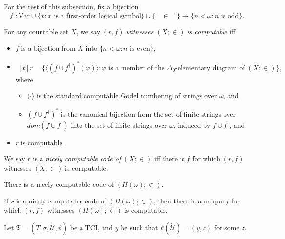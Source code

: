 \documentclass[12pt]{article}
\numberwithin{equation}{section}
\begin{document}
For the rest of this subsection, fix a bijection $$f^{\dagger} : \mathrm{Var} \cup \{x : x \text{ is a first-order logical symbol}\} \cup \{\ulcorner \in \urcorner\} \longrightarrow \{n < \omega : n \text{ is odd}\}.$$

\begin{defi}
For any countable set $X$, we say $(r, f)$ \emph{witnesses} $(X; \in)$ \emph{is computable} iff
\begin{itemize} 
    \item $f$ is a bijection from $X$ into $\{n < \omega : n \text{ is even}\}$,
    \item
    \!
    $\begin{aligned}[t]
        r = \{\langle (f \cup f^{\dagger})^*(\varphi) \rangle : \varphi \text{ is a member of the } \Delta_0 \text{-elementary diagram of } (X; \in)\}, 
    \end{aligned}$
    \medskip
    \\
    where 
    \begin{itemize}[label=$\circ$]
        \item $\langle \cdot \rangle$ is the standard computable G\"odel numbering of strings over $\omega$, and
        \item $(f \cup f^{\dagger})^*$ is the canonical bijection from the set of finite strings over $dom(f \cup f^{\dagger})$ into the set of finite strings over $\omega$, induced by $f \cup f^{\dagger}$, and
    \end{itemize}
    \item $r$ is computable.
\end{itemize}
We say $r$ is a \emph{nicely computable code of} $(X; \in)$ iff there is $f$ for which $(r, f)$ witnesses $(X; \in)$ is computable.
\end{defi}

\begin{fact}
There is a nicely computable code of $(H(\omega); \in)$. 
\end{fact}

\begin{fact}\label{uniquecode}
If $r$ is a nicely computable code of $(H(\omega); \in)$, then there is a unique $f$ for which $(r, f)$ witnesses $(H(\omega); \in)$ is computable.
\end{fact}

Let $\mathfrak{T} = (T, \sigma, \dot{\mathcal{U}}, \vartheta)$ be a TCI, and $y$ be such that $\vartheta(\dot{\mathcal{U}}) = (y, z)$ for some $z$.
\end{document}
